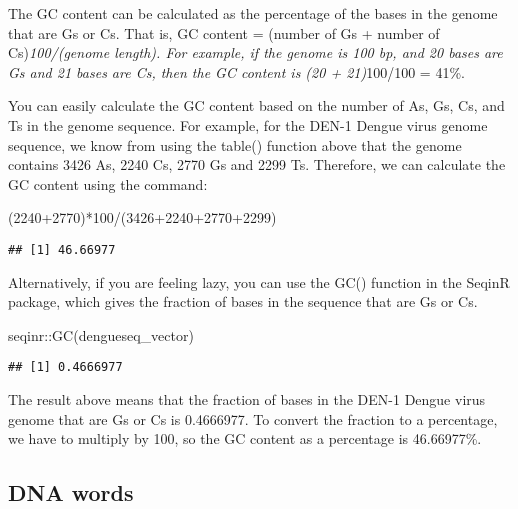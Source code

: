 \documentclass[
]{book}
\newenvironment{Shaded}{\begin{snugshade}}{\end{snugshade}}
\newcommand{\DecValTok}[1]{\textcolor[rgb]{0.00,0.00,0.81}{#1}}
\newcommand{\FunctionTok}[1]{\textcolor[rgb]{0.00,0.00,0.00}{#1}}
\newcommand{\NormalTok}[1]{#1}
\newcommand{\SpecialCharTok}[1]{\textcolor[rgb]{0.00,0.00,0.00}{#1}}
\begin{document}
The GC content can be calculated as the percentage of the bases in the genome that are Gs or Cs. That is, GC content = (number of Gs + number of Cs)\emph{100/(genome length). For example, if the genome is 100 bp, and 20 bases are Gs and 21 bases are Cs, then the GC content is (20 + 21)}100/100 = 41\%.

You can easily calculate the GC content based on the number of As, Gs, Cs, and Ts in the genome sequence. For example, for the DEN-1 Dengue virus genome sequence, we know from using the table() function above that the genome contains 3426 As, 2240 Cs, 2770 Gs and 2299 Ts. Therefore, we can calculate the GC content using the command:

\begin{Shaded}
\begin{Highlighting}[]
\NormalTok{(}\DecValTok{2240}\SpecialCharTok{+}\DecValTok{2770}\NormalTok{)}\SpecialCharTok{*}\DecValTok{100}\SpecialCharTok{/}\NormalTok{(}\DecValTok{3426}\SpecialCharTok{+}\DecValTok{2240}\SpecialCharTok{+}\DecValTok{2770}\SpecialCharTok{+}\DecValTok{2299}\NormalTok{)}
\end{Highlighting}
\end{Shaded}

\begin{verbatim}
## [1] 46.66977
\end{verbatim}

Alternatively, if you are feeling lazy, you can use the GC() function in the SeqinR package, which gives the fraction of bases in the sequence that are Gs or Cs.

\begin{Shaded}
\begin{Highlighting}[]
\NormalTok{seqinr}\SpecialCharTok{::}\FunctionTok{GC}\NormalTok{(dengueseq\_vector)}
\end{Highlighting}
\end{Shaded}

\begin{verbatim}
## [1] 0.4666977
\end{verbatim}

The result above means that the fraction of bases in the DEN-1 Dengue virus genome that are Gs or Cs is 0.4666977. To convert the fraction to a percentage, we have to multiply by 100, so the GC content as a percentage is 46.66977\%.

\hypertarget{dna-words}{%
\subsection{DNA words}\label{dna-words}}
\end{document}
